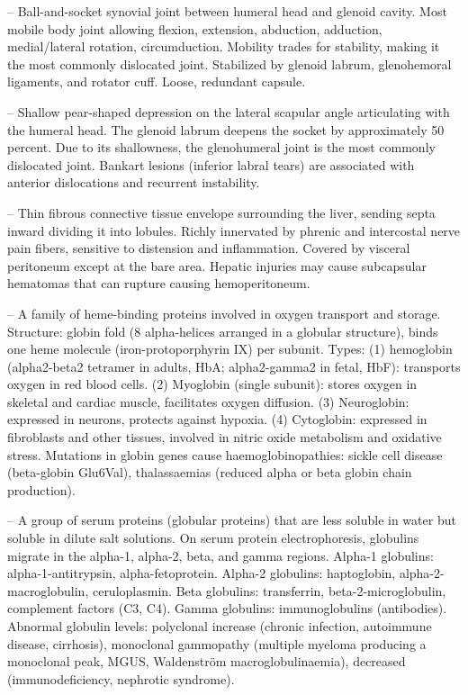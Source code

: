 -- Ball-and-socket synovial joint between humeral head and glenoid cavity. Most mobile body joint allowing flexion, extension, abduction, adduction, medial/lateral rotation, circumduction. Mobility trades for stability, making it the most commonly dislocated joint. Stabilized by glenoid labrum, glenohemoral ligaments, and rotator cuff. Loose, redundant capsule.

-- Shallow pear-shaped depression on the lateral scapular angle articulating with the humeral head. The glenoid labrum deepens the socket by approximately 50 percent. Due to its shallowness, the glenohumeral joint is the most commonly dislocated joint. Bankart lesions (inferior labral tears) are associated with anterior dislocations and recurrent instability.

-- Thin fibrous connective tissue envelope surrounding the liver, sending septa inward dividing it into lobules. Richly innervated by phrenic and intercostal nerve pain fibers, sensitive to distension and inflammation. Covered by visceral peritoneum except at the bare area. Hepatic injuries may cause subcapsular hematomas that can rupture causing hemoperitoneum.

-- A family of heme-binding proteins involved in oxygen transport and storage. Structure: globin fold (8 alpha-helices arranged in a globular structure), binds one heme molecule (iron-protoporphyrin IX) per subunit. Types: (1) hemoglobin (alpha2-beta2 tetramer in adults, HbA; alpha2-gamma2 in fetal, HbF): transports oxygen in red blood cells. (2) Myoglobin (single subunit): stores oxygen in skeletal and cardiac muscle, facilitates oxygen diffusion. (3) Neuroglobin: expressed in neurons, protects against hypoxia. (4) Cytoglobin: expressed in fibroblasts and other tissues, involved in nitric oxide metabolism and oxidative stress. Mutations in globin genes cause haemoglobinopathies: sickle cell disease (beta-globin Glu6Val), thalassaemias (reduced alpha or beta globin chain production).

-- A group of serum proteins (globular proteins) that are less soluble in water but soluble in dilute salt solutions. On serum protein electrophoresis, globulins migrate in the alpha-1, alpha-2, beta, and gamma regions. Alpha-1 globulins: alpha-1-antitrypsin, alpha-fetoprotein. Alpha-2 globulins: haptoglobin, alpha-2-macroglobulin, ceruloplasmin. Beta globulins: transferrin, beta-2-microglobulin, complement factors (C3, C4). Gamma globulins: immunoglobulins (antibodies). Abnormal globulin levels: polyclonal increase (chronic infection, autoimmune disease, cirrhosis), monoclonal gammopathy (multiple myeloma producing a monoclonal peak, MGUS, Waldenström macroglobulinaemia), decreased (immunodeficiency, nephrotic syndrome).

